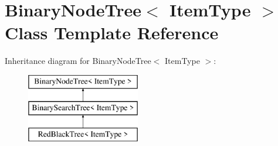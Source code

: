 \hypertarget{class_binary_node_tree}{}\section{Binary\+Node\+Tree$<$ Item\+Type $>$ Class Template Reference}
\label{class_binary_node_tree}
Inheritance diagram for Binary\+Node\+Tree$<$ Item\+Type $>$\+:\begin{figure}[H]
\begin{center}
\leavevmode
\includegraphics[height=3.000000cm]{class_binary_node_tree}
\end{center}
\end{figure}
